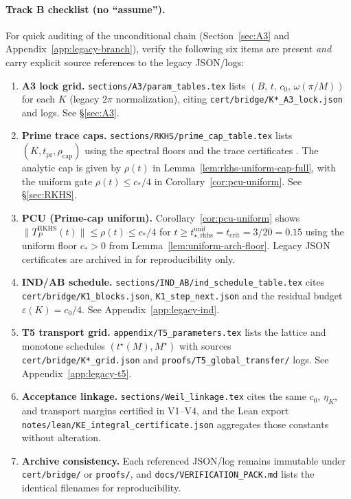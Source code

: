 \paragraph{Track B checklist (no ``assume'').}
For quick auditing of the unconditional chain (Section~\ref{sec:A3} and Appendix~\ref{app:legacy-branch}), verify the following six items are present \emph{and} carry explicit source references to the legacy JSON/logs:
\begin{enumerate}[label=\textbf{V\arabic*.}, leftmargin=2.2em]
  \item \textbf{A3 lock grid.} \texttt{sections/A3/param\_tables.tex} lists $(B,\,t,\,c_0,\,\omega(\pi/M))$ for each $K$ (legacy $2\pi$ normalization), citing \verb|cert/bridge/K*_A3_lock.json| and logs. See \S\ref{sec:A3}.
  \item \textbf{Prime trace caps.} \texttt{sections/RKHS/prime\_cap\_table.tex} lists $(K,t_{\mathrm{pr}},\rho_{\mathrm{cap}})$ using the spectral floors  and the trace certificates . The analytic cap is given by $\rho(t)$ in Lemma~\ref{lem:rkhs-uniform-cap-full}, with the uniform gate $\rho(t)\le c_*/4$ in Corollary~\ref{cor:pcu-uniform}. See \S\ref{sec:RKHS}.
  \item \textbf{PCU (Prime-cap uniform).} Corollary~\ref{cor:pcu-uniform} shows $\|T_P^{\mathrm{RKHS}}(t)\|\le\rho(t)\le c_*/4$ for $t\ge t_{\star,\mathrm{rkhs}}^{\mathrm{unif}}=t_{\mathrm{crit}}=3/20=0.15$ using the uniform floor $c_*>0$ from Lemma~\ref{lem:uniform-arch-floor}. Legacy JSON certificates are archived in  for reproducibility only.
  \item \textbf{IND/AB schedule.} \texttt{sections/IND\_AB/ind\_schedule\_table.tex} cites \verb|cert/bridge/K1_blocks.json|, \verb|K1_step_next.json| and the residual budget $\varepsilon(K)=c_0/4$. See Appendix~\ref{app:legacy-ind}.
  \item \textbf{T5 transport grid.} \texttt{appendix/T5\_parameters.tex} lists the lattice and monotone schedules $(t^\star(M),M^\star)$ with sources \verb|cert/bridge/K*_grid.json| and \verb|proofs/T5_global_transfer/| logs. See Appendix~\ref{app:legacy-t5}.
  \item \textbf{Acceptance linkage.} \texttt{sections/Weil\_linkage.tex} cites the same $c_0$, $\eta_K$, and transport margins certified in V1--V4, and the Lean export \texttt{notes/lean/KE\_integral\_certificate.json} aggregates those constants without alteration.
  \item \textbf{Archive consistency.} Each referenced JSON/log remains immutable under \texttt{cert/bridge/} or \texttt{proofs/}, and \texttt{docs/VERIFICATION\_PACK.md} lists the identical filenames for reproducibility.
\end{enumerate}

